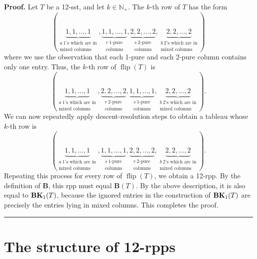 \documentclass[12pt]{article}
\theoremstyle{plain}
\theoremstyle{definition}
\newenvironment{proof}[1][Proof]{\noindent\textbf{#1.} }{\ \rule{0.5em}{0.5em}}
\begin{document}
\begin{proof}
Let $T$ be a 12-sst, and let $k \in \mathbb{N}_+$. The $k$-th row of $T$ has the form
\[
\left(  \underbrace{1,1,\ldots,1}_{\substack{a \ 1\text{'s
which are in}\\\text{mixed columns}}%
},\underbrace{1,1,\ldots,1}_{\substack{r \ 1\text{-pure}%
\\\text{columns}}%
},\underbrace{2,2,\ldots,2}_{\substack{s \ 2\text{-pure}%
\\\text{columns}}%
},\underbrace{2,2,\ldots,2}_{\substack{b \ 2\text{'s
which are in}\\\text{mixed columns}}}\right)
\]
where we use the observation that each 1-pure and each 2-pure column contains only one entry. Thus, the $k$-th row of $\operatorname*{flip}\left(  T\right)$ is
\[
\left(  \underbrace{1,1,\ldots,1}_{\substack{a \ 1\text{'s
which are in}\\\text{mixed columns}}%
},\underbrace{2,2,\ldots,2}_{\substack{r \ 2\text{-pure}%
\\\text{columns}}%
},\underbrace{1,1,\ldots,1}_{\substack{s \ 1\text{-pure}%
\\\text{columns}}%
},\underbrace{2,2,\ldots,2}_{\substack{b \ 2\text{'s
which are in}\\\text{mixed columns}}}\right).
\]
We can now repeatedly apply descent-resolution steps to obtain a tableau whose $k$-th row is
\[
\left(  \underbrace{1,1,\ldots,1}_{\substack{a \ 1\text{'s
which are in}\\\text{mixed columns}}%
},\underbrace{1,1,\ldots,1}_{\substack{s \ 1\text{-pure}%
\\\text{columns}}%
},\underbrace{2,2,\ldots,2}_{\substack{r \ 2\text{-pure}%
\\\text{columns}}%
},\underbrace{2,2,\ldots,2}_{\substack{b \ 2\text{'s
which are in}\\\text{mixed columns}}}\right).
\]
Repeating this process for every row of $\operatorname*{flip}\left(  T\right)$,
we obtain a 12-rpp. By the definition of $\mathbf{B}$, this rpp must equal $\mathbf{B}(T)$. By the above description, it is also equal to ${\mathbf{BK}}_1(T)$, because the ignored entries in the construction of ${\mathbf{BK}}_1(T)$ are precisely the entries lying in mixed columns. This completes the proof.
\end{proof}



\section{The structure of 12-rpps}
\label{sect.structure}
\end{document}
